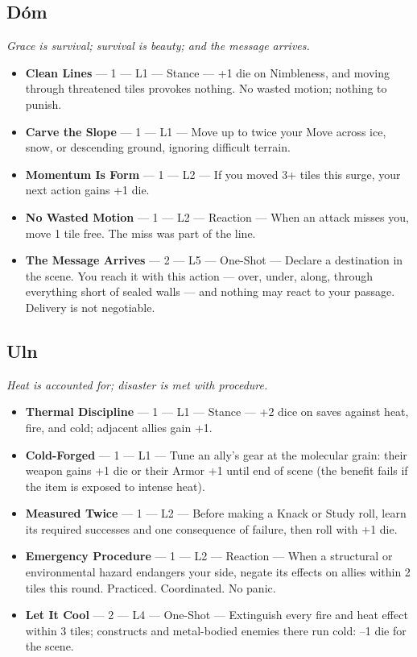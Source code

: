 \subsection{Dóm}
\textit{Grace is survival; survival is beauty; and the message arrives.}
\begin{itemize}
    \item \textbf{Clean Lines} --- 1 --- L1 --- Stance --- +1 die on Nimbleness, and moving through threatened tiles provokes nothing. No wasted motion; nothing to punish.
    \item \textbf{Carve the Slope} --- 1 --- L1 --- Move up to twice your Move across ice, snow, or descending ground, ignoring difficult terrain.
    \item \textbf{Momentum Is Form} --- 1 --- L2 --- If you moved 3+ tiles this surge, your next action gains +1 die.
    \item \textbf{No Wasted Motion} --- 1 --- L2 --- Reaction --- When an attack misses you, move 1 tile free. The miss was part of the line.
    \item \textbf{The Message Arrives} --- 2 --- L5 --- One-Shot --- Declare a destination in the scene. You reach it with this action --- over, under, along, through everything short of sealed walls --- and nothing may react to your passage. Delivery is not negotiable.
\end{itemize}

\subsection{Uln}
\textit{Heat is accounted for; disaster is met with procedure.}
\begin{itemize}
    \item \textbf{Thermal Discipline} --- 1 --- L1 --- Stance --- +2 dice on saves against heat, fire, and cold; adjacent allies gain +1.
    \item \textbf{Cold-Forged} --- 1 --- L1 --- Tune an ally's gear at the molecular grain: their weapon gains +1 die or their Armor +1 until end of scene (the benefit fails if the item is exposed to intense heat).
    \item \textbf{Measured Twice} --- 1 --- L2 --- Before making a Knack or Study roll, learn its required successes and one consequence of failure, then roll with +1 die.
    \item \textbf{Emergency Procedure} --- 1 --- L2 --- Reaction --- When a structural or environmental hazard endangers your side, negate its effects on allies within 2 tiles this round. Practiced. Coordinated. No panic.
    \item \textbf{Let It Cool} --- 2 --- L4 --- One-Shot --- Extinguish every fire and heat effect within 3 tiles; constructs and metal-bodied enemies there run cold: --1 die for the scene.
\end{itemize}

